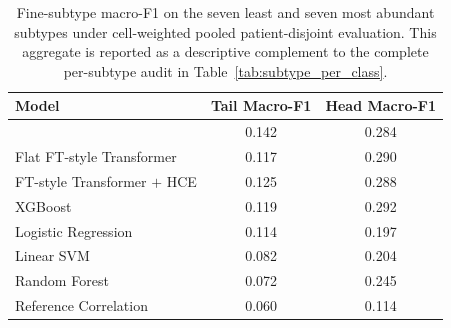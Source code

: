 \begin{table}[H]
\centering
\small
\setlength{\tabcolsep}{8pt}
\renewcommand{\arraystretch}{1.10}
\begin{tabular}{lcc}
\toprule
\textbf{Model} & \textbf{Tail Macro-F1} & \textbf{Head Macro-F1} \\
\midrule
\ourmethod{} & 0.142 & 0.284 \\
Flat FT-style Transformer & 0.117 & 0.290 \\
FT-style Transformer $+$ HCE & 0.125 & 0.288 \\
XGBoost & 0.119 & 0.292 \\
Logistic Regression & 0.114 & 0.197 \\
Linear SVM & 0.082 & 0.204 \\
Random Forest & 0.072 & 0.245 \\
Reference Correlation & 0.060 & 0.114 \\
\bottomrule
\end{tabular}
\caption{Fine-subtype macro-F1 on the seven least and seven most abundant subtypes under cell-weighted pooled patient-disjoint evaluation. This aggregate is reported as a descriptive complement to the complete per-subtype audit in Table~\ref{tab:subtype_per_class}.}
\label{tab:tail_head}
\end{table}
